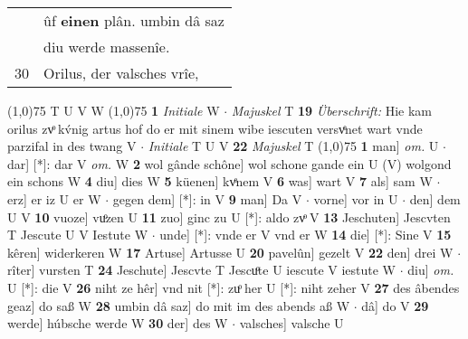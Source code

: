 \documentclass[8pt,a4paper,notitlepage]{article}
\begin{document}
\begin{table}[ht]
\begin{minipage}[t]{0.5\linewidth}
\begin{tabular}{rl}
 & ûf \textbf{einen} plân. umbin dâ saz\\ 
 & diu werde massenîe.\\ 
30 & Orilus, der valsches vrîe,\\ 
\end{tabular}
\scriptsize
\line(1,0){75} \newline
T U V W \newline
\line(1,0){75} \newline
\textbf{1} \textit{Initiale} W   $\cdot$ \textit{Majuskel} T  \textbf{19} \textit{Überschrift: } Hie kam orilus zvͦ kv́nig artus hof do er mit sinem wibe iescuten versvͤnet wart vnde parzifal in des twang V   $\cdot$ \textit{Initiale} T U V  \textbf{22} \textit{Majuskel} T  \newline
\line(1,0){75} \newline
\textbf{1} man] \textit{om.} U  $\cdot$ dar] [*]: dar V \textit{om.} W \textbf{2} wol gânde schône] wol schone gande ein U (V) wolgond ein schons W \textbf{4} diu] dies W \textbf{5} küenen] kvͤnem V \textbf{6} was] wart V \textbf{7} als] sam W  $\cdot$ erz] er iz U er W  $\cdot$ gegen dem] [*]: in V \textbf{9} man] Da V  $\cdot$ vorne] vor in U  $\cdot$ den] dem U V \textbf{10} vuoze] vuͦzen U \textbf{11} zuo] ginc zu U [*]: aldo zvͦ V \textbf{13} Jeschuten] Jescvten T Jescute U V Iestute W  $\cdot$ unde] [*]: vnde er V vnd er W \textbf{14} die] [*]: Sine V \textbf{15} kêren] widerkeren W \textbf{17} Artuse] Artusse U \textbf{20} pavelûn] gezelt V \textbf{22} den] drei W  $\cdot$ rîter] vursten T \textbf{24} Jeschute] Jescvte T Jescuͦte U iescute V iestute W  $\cdot$ diu] \textit{om.} U [*]: die V \textbf{26} niht ze hêr] vnd nit [*]: zuͦ her U [*]: niht zeher V \textbf{27} des âbendes geaz] do saß W \textbf{28} umbin dâ saz] do mit im des abends aß W  $\cdot$ dâ] do V \textbf{29} werde] húbsche werde W \textbf{30} der] des W  $\cdot$ valsches] valsche U \newline
\end{minipage}
\end{table}
\end{document}
